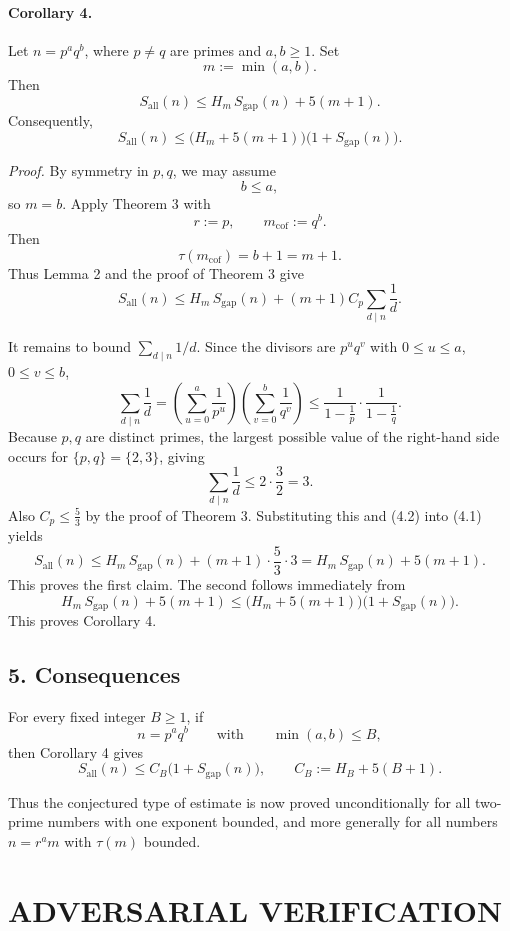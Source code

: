 \paragraph{Corollary 4.}
Let \(n=p^a q^b\), where \(p\neq q\) are primes and \(a,b\geq 1\). Set
\[
m:=\min(a,b).
\]
Then
\[
S_{\mathrm{all}}(n)\leq H_m\,S_{\mathrm{gap}}(n)+5(m+1).
\]
Consequently,
\[
S_{\mathrm{all}}(n)\leq \bigl(H_m+5(m+1)\bigr)\bigl(1+S_{\mathrm{gap}}(n)\bigr).
\]

\emph{Proof.}
By symmetry in \(p,q\), we may assume
\[
b\leq a,
\]
so \(m=b\). Apply Theorem 3 with
\[
r:=p,
\qquad
m_{\mathrm{cof}}:=q^b.
\]
Then
\[
\tau(m_{\mathrm{cof}})=b+1=m+1.
\]
Thus Lemma 2 and the proof of Theorem 3 give
\[
S_{\mathrm{all}}(n)
\leq
H_m\,S_{\mathrm{gap}}(n)+(m+1)C_p\sum_{d\mid n}\frac1d.
\tag{4.1}
\]

It remains to bound \(\sum_{d\mid n}1/d\). Since the divisors are \(p^u q^v\) with \(0\leq u\leq a\), \(0\leq v\leq b\),
\[
\sum_{d\mid n}\frac1d
=
\left(\sum_{u=0}^{a}\frac1{p^u}\right)\left(\sum_{v=0}^{b}\frac1{q^v}\right)
\leq
\frac{1}{1-\frac1p}\cdot \frac{1}{1-\frac1q}.
\]
Because \(p,q\) are distinct primes, the largest possible value of the right-hand side occurs for \(\{p,q\}=\{2,3\}\), giving
\[
\sum_{d\mid n}\frac1d \leq 2\cdot \frac32 = 3.
\tag{4.2}
\]
Also \(C_p\leq \frac53\) by the proof of Theorem 3. Substituting this and (4.2) into (4.1) yields
\[
S_{\mathrm{all}}(n)
\leq
H_m\,S_{\mathrm{gap}}(n)+(m+1)\cdot \frac53\cdot 3
=
H_m\,S_{\mathrm{gap}}(n)+5(m+1).
\]
This proves the first claim. The second follows immediately from
\[
H_m\,S_{\mathrm{gap}}(n)+5(m+1)\leq \bigl(H_m+5(m+1)\bigr)\bigl(1+S_{\mathrm{gap}}(n)\bigr).
\]
This proves Corollary 4.

\subsection*{5. Consequences}

For every fixed integer \(B\geq 1\), if
\[
n=p^a q^b
\qquad\text{with}\qquad
\min(a,b)\leq B,
\]
then Corollary 4 gives
\[
S_{\mathrm{all}}(n)\leq C_B\bigl(1+S_{\mathrm{gap}}(n)\bigr),
\qquad
C_B:=H_B+5(B+1).
\]

Thus the conjectured type of estimate is now proved unconditionally for all two-prime numbers with one exponent bounded, and more generally for all numbers \(n=r^a m\) with \(\tau(m)\) bounded.

\section{ADVERSARIAL VERIFICATION}

